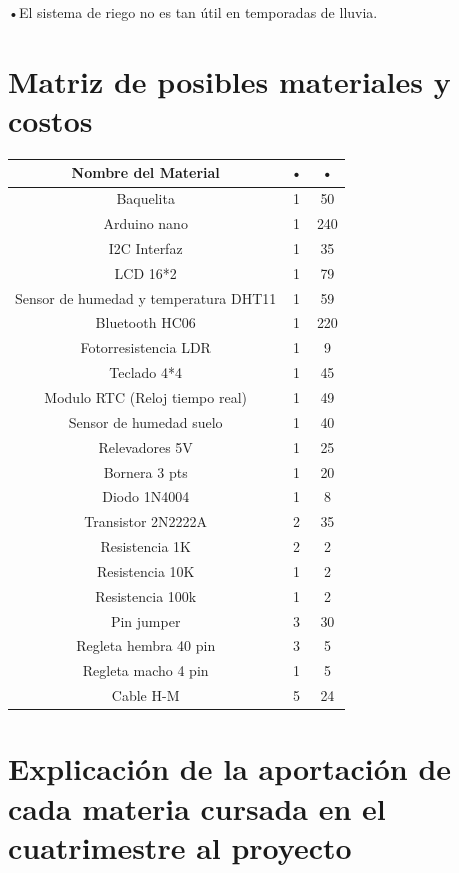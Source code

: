 \documentclass[a4paper,11pt,titlepage]{article}
\begin{document}
\begin{titlepage}
•El sistema de riego no es tan útil en temporadas de lluvia.

\section{Matriz de posibles materiales y costos}

\begin{tabular}{|c|c|c|}
\hline 
Nombre del Material & • & • \\ 
\hline 
Baquelita & 1 & 50 \\ 
\hline 
Arduino nano & 1 & 240 \\ 
\hline 
I2C Interfaz
 & 1 & 35 \\ 
\hline 
LCD 16*2 & 1 & 79 \\ 
\hline 
Sensor de humedad y temperatura DHT11 & 1 & 59 \\ 
\hline 
Bluetooth HC06 & 1 & 220 \\ 
\hline 
Fotorresistencia LDR  & 1 & 9 \\ 
\hline 
Teclado 4*4 & 1 & 45 \\ 
\hline 
Modulo RTC (Reloj tiempo real) & 1 & 49 \\ 
\hline 
Sensor de humedad suelo & 1 & 40 \\ 
\hline 
Relevadores 5V & 1 & 25 \\ 
\hline 
Bornera 3 pts & 1 & 20 \\ 
\hline 
Diodo 1N4004 & 1 & 8 \\ 
\hline 
Transistor 2N2222A & 2 & 35 \\ 
\hline 
Resistencia 1K & 2 & 2 \\ 
\hline 
Resistencia 10K & 1 & 2 \\ 
\hline 
Resistencia 100k & 1 & 2 \\ 
\hline 
Pin jumper & 3 & 30 \\ 
\hline 
Regleta hembra 40 pin & 3 & 5 \\ 
\hline 
Regleta macho 4 pin & 1 & 5 \\ 
\hline 
Cable H-M & 5 & 24 \\ 
\hline 
\end{tabular} 
                                                                                                      
\section{Explicación de la aportación de cada materia cursada en el cuatrimestre al proyecto}


\end{titlepage}
\end{document}
